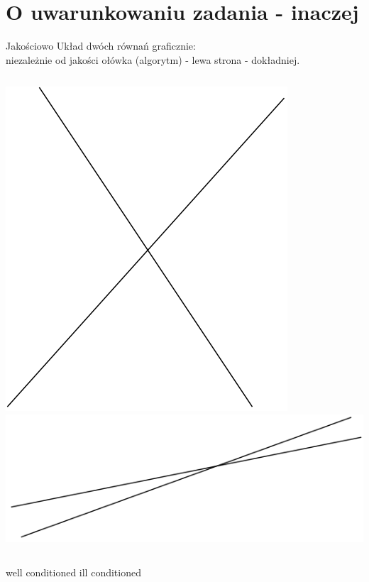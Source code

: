 \section{O uwarunkowaniu zadania - inaczej}
\begin{frame}{Jakościowo}
	Układ dwóch równań graficznie: \\
    niezależnie od jakości ołówka (algorytm) - lewa strona - dokładniej.
    
    \vspace{.5cm}
    \begin{columns}
    	\centering   \includegraphics[width=.7\linewidth]{img/2/2_2_well_conditioned}
    	\centering   \includegraphics[width=.7\linewidth]{img/2/2_3_ill_conditioned}
    \end{columns}
    \vspace{.5cm}
    \begin{columns}
    	\centering   well conditioned
    	\centering   ill conditioned
    \end{columns}
\end{frame}
